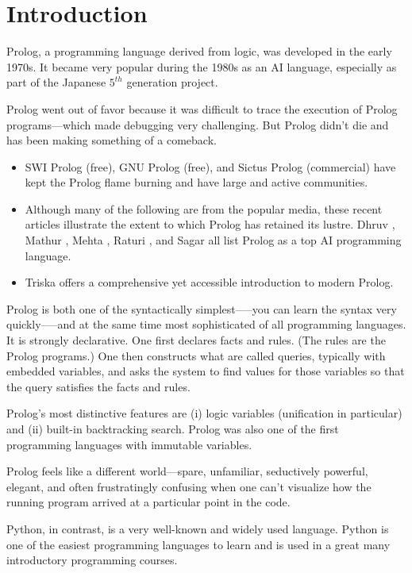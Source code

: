 \section{Introduction}

Prolog, a programming language derived from logic, was developed in the early 1970s. It became very popular during the 1980s as an AI language, especially as part of the Japanese $5^{th}$ generation project.

Prolog went out of favor because it was difficult to trace the execution of Prolog programs---which made debugging very challenging. But Prolog didn't die and has been making something of a comeback. 
\begin{itemize}
    \item SWI Prolog (free), GNU Prolog (free), and Sictus Prolog (commercial) have kept the Prolog flame burning and have large and active communities.
    \item  Although many of the following are from the popular media, these recent articles illustrate the extent to which Prolog has retained its lustre. Dhruv \cite{Dhruv2018}, Mathur \cite{Mathur2018}, Mehta \cite{Mehta2018},  Raturi \cite{Raturi2019}, and Sagar \cite{Sagar2019} all list Prolog as a top AI programming language. 
    \item Triska \cite{Triska2020} offers a comprehensive yet accessible introduction to modern Prolog. 
\end{itemize}

Prolog is both one of the syntactically simplest—--you can learn the syntax very quickly--—and at the same time most sophisticated of all programming languages. It is strongly declarative. One first declares facts and rules. (The rules are the Prolog programs.) One then constructs what are called queries, typically with embedded variables, and asks the system to find values for those variables so that the query satisfies the facts and rules. 

Prolog's most distinctive features are (i) logic variables (unification in particular) and (ii) built-in backtracking search. Prolog was also one of the first programming languages with immutable variables. 

Prolog feels like a different world---spare, unfamiliar, seductively powerful, elegant, and often frustratingly confusing when one can't visualize how the running program arrived at a particular point in the code. 

Python, in contrast, is a very well-known and widely used language. Python is one of the easiest programming languages to learn and is used in a great many introductory programming courses. 

